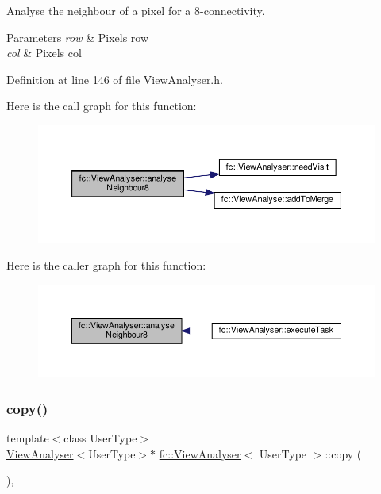 Analyse the neighbour of a pixel for a 8-\/connectivity. 


\begin{DoxyParams}{Parameters}
{\em row} & Pixel\textquotesingle{}s row \\
\hline
{\em col} & Pixel\textquotesingle{}s col \\
\hline
\end{DoxyParams}


Definition at line 146 of file View\+Analyser.\+h.

Here is the call graph for this function\+:
\nopagebreak
\begin{figure}[H]
\begin{center}
\leavevmode
\includegraphics[width=350pt]{df/daf/classfc_1_1ViewAnalyser_ae29f29bef0e7b1b7ccc48f0f6be593ae_cgraph}
\end{center}
\end{figure}
Here is the caller graph for this function\+:
\nopagebreak
\begin{figure}[H]
\begin{center}
\leavevmode
\includegraphics[width=350pt]{df/daf/classfc_1_1ViewAnalyser_ae29f29bef0e7b1b7ccc48f0f6be593ae_icgraph}
\end{center}
\end{figure}
\mbox{\label{classfc_1_1ViewAnalyser_a9ee0c5c4bbd93b191e62fb9633666e89}} 
\subsubsection{\texorpdfstring{copy()}{copy()}}
{\footnotesize\ttfamily template$<$class User\+Type$>$ \\
\hyperlink{classfc_1_1ViewAnalyser}{View\+Analyser}$<$User\+Type$>$$\ast$ \hyperlink{classfc_1_1ViewAnalyser}{fc\+::\+View\+Analyser}$<$ User\+Type $>$\+::copy (\begin{DoxyParamCaption}{ }\end{DoxyParamCaption})\hspace{0.3cm}{\ttfamily [inline]}, {\ttfamily [override]}}



